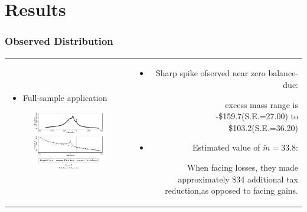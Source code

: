 \documentclass[dvipdfmx,12pt]{beamer}
\begin{document}
\section{Results}
\begin{frame}\frametitle{Observed Distribution}

\begin{tabular}{lr}
  \begin{minipage}[H]{0.4\textwidth}
    \begin{itemize}
      \item Full-sample application
    \end{itemize}
    \begin{figure}[H]
      \includegraphics[keepaspectratio, scale = 0.4]{fig_tab/ARJ_F2}
    \end{figure}
  \end{minipage} &
  \begin{minipage}[H]{0.45\textwidth}
    \begin{itemize}

      \item Sharp spike ofserved near zero balance-due:

      excess mass range is -\$159.7(S.E.=27.00) to \$103.2(S.E.=36.20)

      \item Estimated value of $\tilde{m} = 33.8$:

      When facing losses, they made approximately \$34 additional tax
      reduction,as opposed to facing gains.
    \end{itemize}
  \end{minipage}
\end{tabular}

\end{frame}
\end{document}
